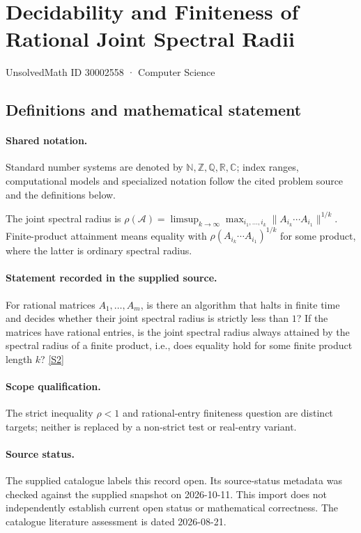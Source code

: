 \documentclass[11pt]{article}
\newcommand{\sref}[2]{\hyperlink{source:#1:#2}{[S#2]}}
\begin{document}
\setcounter{section}{30002557}
\section{Decidability and Finiteness of Rational Joint Spectral Radii}\label{30002558}
{\small\sffamily UnsolvedMath ID 30002558 · Computer Science}
\subsection{Definitions and mathematical statement}

\paragraph{Shared notation.}Standard number systems are denoted by $\mathbb N,\mathbb Z,\mathbb Q,\mathbb R,\mathbb C$; index ranges, computational models and specialized notation follow the cited problem source and the definitions below.


The joint spectral radius is $\rho(\mathcal A)=\limsup_{k\to\infty}\max_{i_1,\ldots,i_k}\lVert A_{i_k}\cdots A_{i_1}\rVert^{1/k}$. Finite-product attainment means equality with $\rho(A_{i_k}\cdots A_{i_1})^{1/k}$ for some product, where the latter is ordinary spectral radius.
\paragraph{Statement recorded in the supplied source.}
For rational matrices $A_1,\ldots,A_m$, is there an algorithm that halts in finite time and decides whether their joint spectral radius is strictly less than $1$? If the matrices have rational entries, is the joint spectral radius always attained by the spectral radius of a finite product, i.e., does equality hold for some finite product length $k$? \sref{30002558}{2}
\paragraph{Scope qualification.}
The strict inequality $\rho<1$ and rational-entry finiteness question are distinct targets; neither is replaced by a non-strict test or real-entry variant.
\paragraph{Source status.}
The supplied catalogue labels this record open. Its source-status metadata was checked against the supplied snapshot on 2026-10-11. This import does not independently establish current open status or mathematical correctness. The catalogue literature assessment is dated 2026-08-21.
\end{document}
